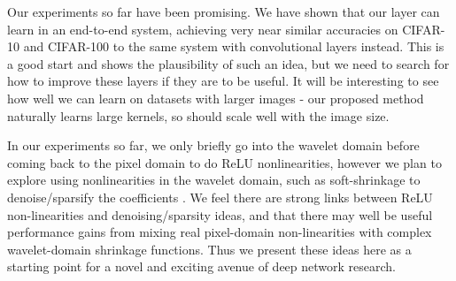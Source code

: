 Our experiments so far have been promising. We have shown that our layer can learn in an
end-to-end system, achieving very near similar accuracies on CIFAR-10 and CIFAR-100 to the same system with
convolutional layers instead. This is a good start and shows the plausibility of such an idea, 
but we need to search for how to improve these layers if they are to be useful. 
It will be interesting to see how well we can learn on datasets with larger images
- our proposed method naturally learns large kernels, so should scale well with the image size.

In our experiments so far, we only briefly go into the wavelet domain before coming back to the
pixel domain to do ReLU nonlinearities, however we plan to explore using nonlinearities in the
wavelet domain, such as soft-shrinkage to denoise/sparsify the coefficients
\cite{donoho_ideal_1994}. We feel there are strong links between ReLU non-linearities and
denoising/sparsity ideas, and that there may well be useful performance gains from mixing real
pixel-domain non-linearities with complex wavelet-domain shrinkage functions. Thus we present these
ideas here as a starting point for a novel and exciting avenue of deep network research.
